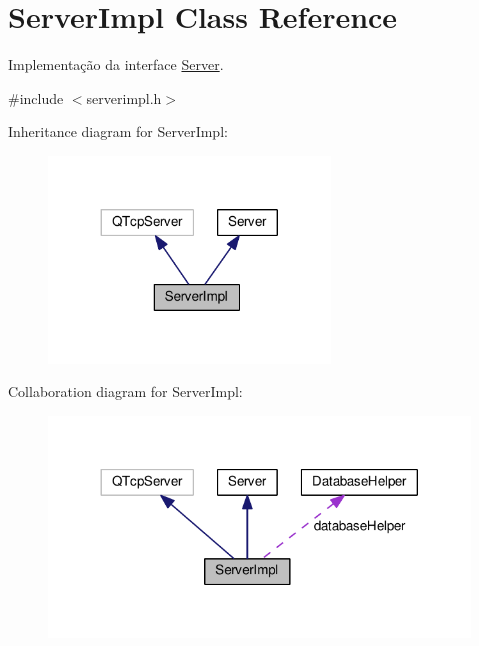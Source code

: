 \hypertarget{classServerImpl}{}\section{Server\+Impl Class Reference}
\label{classServerImpl}


Implementação da interface \hyperlink{classServer}{Server}.  




{\ttfamily \#include $<$serverimpl.\+h$>$}



Inheritance diagram for Server\+Impl\+:\nopagebreak
\begin{figure}[H]
\begin{center}
\leavevmode
\includegraphics[width=212pt]{d3/da0/classServerImpl__inherit__graph}
\end{center}
\end{figure}


Collaboration diagram for Server\+Impl\+:\nopagebreak
\begin{figure}[H]
\begin{center}
\leavevmode
\includegraphics[width=317pt]{de/d15/classServerImpl__coll__graph}
\end{center}
\end{figure}
